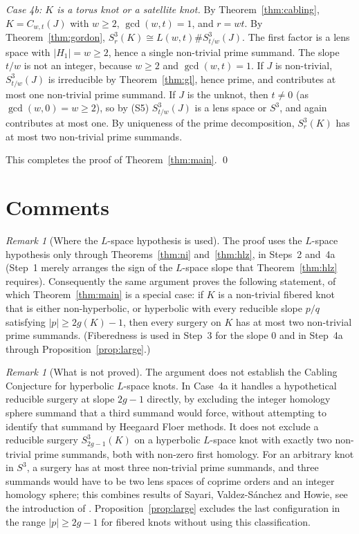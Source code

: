 \documentclass[11pt]{article}
\newcommand{\Surg}[2]{S^3_{#1}(#2)}
\theoremstyle{definition}
\theoremstyle{remark}
\newtheorem{remark}[theorem]{Remark}
\begin{document}
\emph{Case 4b: \(K\) is a torus knot or a satellite knot.} By
Theorem~\ref{thm:cabling}, \(K=C_{w,t}(J)\) with \(w\geq2\),
\(\gcd(w,t)=1\), and \(r=wt\). By Theorem~\ref{thm:gordon},
\(\Surg{r}{K}\cong L(w,t)\#\Surg{t/w}{J}\). The first factor is a lens
space with \(|H_1|=w\geq2\), hence a single non-trivial prime summand.
The slope \(t/w\) is not an integer, because \(w\geq2\) and
\(\gcd(w,t)=1\). If \(J\) is non-trivial, \(\Surg{t/w}{J}\) is irreducible
by Theorem~\ref{thm:gl}, hence prime, and contributes at most one
non-trivial prime summand. If \(J\) is the unknot, then \(t\neq0\) (as
\(\gcd(w,0)=w\geq2\)), so by (S5) \(\Surg{t/w}{J}\) is a lens space or
\(S^3\), and again contributes at most one. By uniqueness of the prime
decomposition, \(\Surg{r}{K}\) has at most two non-trivial prime
summands.

This completes the proof of Theorem~\ref{thm:main}. \qed

\section{Comments}\label{sec:comments}

\begin{remark}[Where the \(L\)-space hypothesis is used]
The proof uses the \(L\)-space hypothesis only through
Theorems~\ref{thm:ni} and~\ref{thm:hlz}, in Steps~2 and~4a (Step~1
merely arranges the sign of the \(L\)-space slope that
Theorem~\ref{thm:hlz} requires). Consequently the same argument proves
the following statement, of which Theorem~\ref{thm:main} is a special
case: if \(K\) is a non-trivial fibered knot that is either
non-hyperbolic, or hyperbolic with every reducible slope \(p/q\)
satisfying \(|p|\geq2g(K)-1\), then every surgery on \(K\) has at most
two non-trivial prime summands. (Fiberedness is used in Step~3 for the
slope \(0\) and in Step~4a through Proposition~\ref{prop:large}.)
\end{remark}

\begin{remark}[What is not proved]\label{rem:notproved}
The argument does not establish the Cabling Conjecture for hyperbolic
\(L\)-space knots. In Case~4a it handles a hypothetical reducible surgery
at slope \(2g-1\) directly, by excluding the integer homology sphere
summand that a third summand would force, without attempting to identify
that summand by Heegaard Floer methods. It does not exclude a reducible
surgery \(\Surg{2g-1}{K}\) on a hyperbolic \(L\)-space knot with exactly
two non-trivial prime summands, both with non-zero first homology.
For an arbitrary knot in \(S^3\), a surgery has at most three
non-trivial prime summands, and three summands would have to be two lens
spaces of coprime orders and an integer homology sphere; this combines
results of Sayari, Valdez-S\'anchez and Howie, see the introduction of
\cite{Howie2010}. 
Proposition~\ref{prop:large} excludes the last
configuration in the range \(|p|\geq2g-1\) for fibered knots without
using this classification.
\end{remark}
\end{document}
